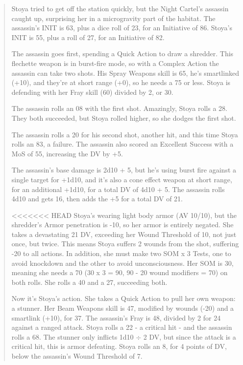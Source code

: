 \begin{quotation} Stoya tried to get off the station quickly, but the Night Cartel’s assassin caught up, surprising her in a microgravity part of the habitat. The assassin’s INIT is 63, plus a dice roll of 23, for an Initiative of 86. Stoya’s INIT is 55, plus a roll of 27, for an Initiative of 82. 

The assassin goes first, spending a Quick Action to draw a shredder. This flechette weapon is in burst-fire mode, so with a Complex Action the assassin can take two shots. His Spray Weapons skill is 65, he’s smartlinked (+10), and they’re at short range (+0), so he needs a 75 or less. Stoya is defending with her Fray skill (60) divided by 2, or 30. 

The assassin rolls an 08 with the first shot. Amazingly, Stoya rolls a 28. They both succeeded, but Stoya rolled higher, so she dodges the first shot. 

The assassin rolls a 20 for his second shot, another hit, and this time Stoya rolls an 83, a failure. The assassin also scored an Excellent Success with a MoS of 55, increasing the DV by +5. 

The assassin’s base damage is 2d10 + 5, but he’s using burst fire against a single target for +1d10, and it’s also a cone effect weapon at short range, for an additional +1d10, for a total DV of 4d10 + 5. The assassin rolls 4d10 and gets 16, then adds the +5 for a total DV of 21. 

<<<<<<< HEAD Stoya’s wearing light body armor (AV 10/10), but the shredder’s Armor penetration is -10, so her armor is entirely negated. She takes a devastating 21 DV, exceeding her Wound Threshold of 10, not just once, but twice. This means Stoya suffers 2 wounds from the shot, suffering -20 to all actions. In addition, she must make two SOM x 3 Tests, one to avoid knockdown and the other to avoid unconsciousness. Her SOM is 30, meaning she needs a 70 (30 x 3 = 90, 90 - 20 wound modifiers = 70) on both rolls. She rolls a 40 and a 27, succeeding both. 

Now it’s Stoya’s action. She takes a Quick Action to pull her own weapon: a stunner. Her Beam Weapons skill is 47, modified by wounds (-20) and a smartlink (+10), for 37. The assassin’s Fray is 48, divided by 2 for 24 against a ranged attack. Stoya rolls a 22 - a critical hit - and the assassin rolls a 68. The stunner only inflicts 1d10 $\div$ 2 DV, but since the attack is a critical hit, this is armor defeating. Stoya rolls an 8, for 4 points of DV, below the assassin’s Wound Threshold of 7. 


\end{quotation}
